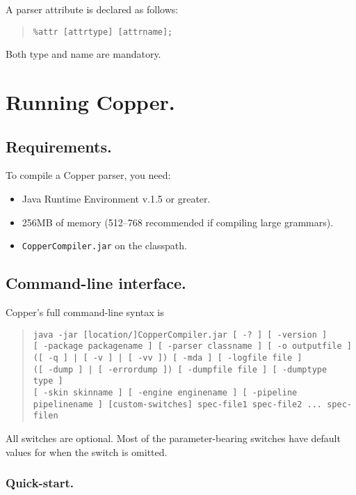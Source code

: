 \documentclass[12pt,english,twoside]{report}
\begin{document}
A parser attribute is declared as follows:

\begin{quote}
\texttt{\%attr {[}attrtype] {[}attrname];}
\end{quote}
Both type and name are mandatory.


\chapter{\label{cha:Running-Copper.}Running Copper.}


\section{Requirements.}

To compile a Copper parser, you need:

\begin{itemize}
\item Java Runtime Environment v.1.5 or greater.
\item 256MB of memory (512--768 recommended if compiling large grammars).
\item \texttt{CopperCompiler.jar} on the classpath.
\end{itemize}

\section{Command-line interface.}

Copper's full command-line syntax is

\begin{quote}
\texttt{java -jar [location/]CopperCompiler.jar
[~-?~]
[~-version~]}\\
\texttt{[~-package packagename~]
[~-parser classname~]
[~-o outputfile~]}\\
\texttt{([~-q~] | [~-v~] | [~-vv~])
[~-mda~]
[~-logfile file~]}\\
\texttt{([~-dump~] | [~-errordump~])
[~-dumpfile file~]
[~-dumptype type~]}\\
\texttt{[~-skin skinname~]
[~-engine enginename~]
[~-pipeline pipelinename~]
[custom-switches]
spec-file1 spec-file2 ... spec-filen}
\end{quote}

All switches are optional. Most of the parameter-bearing switches have
default values for when the switch is omitted.

\subsection{Quick-start.}
\end{document}

